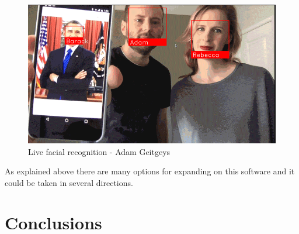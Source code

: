 \documentclass{article}
\begin{document}
\begin{figure}[h!]
\includegraphics[scale=0.5]{images/facerec.png}
\caption{\cite{ageitgey}Live facial recognition - Adam Geitgeys}
\end{figure}

As explained above there are many options for expanding on this software and it could be taken in several directions.

\newpage

\section{Conclusions}


\newpage
\printbibliography
\end{document}
